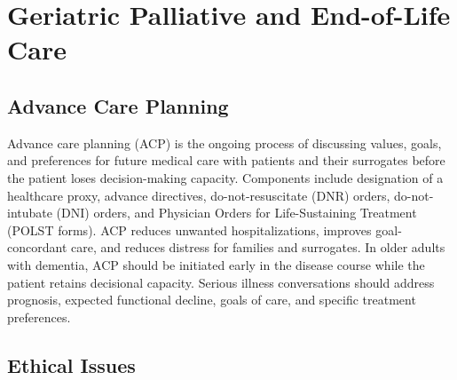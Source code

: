 \section{Geriatric Palliative and End-of-Life Care}








\label{sec:Geriatric Palliative and End-of-Life Care}

\subsection{Advance Care Planning}
\label{sec:Advance Care Planning}

Advance care planning (ACP) is the ongoing process of discussing values, goals, and preferences for future medical care with patients and their surrogates before the patient loses decision-making capacity. Components include designation of a healthcare proxy, advance directives, do-not-resuscitate (DNR) orders, do-not-intubate (DNI) orders, and Physician Orders for Life-Sustaining Treatment (POLST forms). ACP reduces unwanted hospitalizations, improves goal-concordant care, and reduces distress for families and surrogates. In older adults with dementia, ACP should be initiated early in the disease course while the patient retains decisional capacity. Serious illness conversations should address prognosis, expected functional decline, goals of care, and specific treatment preferences.

\subsection{Ethical Issues}
\label{sec:Ethical Issues}

